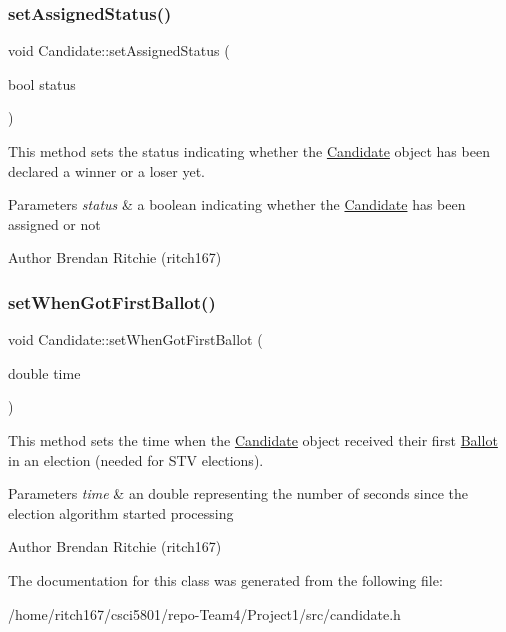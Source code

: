 \subsubsection{\texorpdfstring{set\+Assigned\+Status()}{setAssignedStatus()}}
{\footnotesize\ttfamily void Candidate\+::set\+Assigned\+Status (\begin{DoxyParamCaption}\item[{bool}]{status }\end{DoxyParamCaption})}

This method sets the status indicating whether the \hyperlink{classCandidate}{Candidate} object has been declared a winner or a loser yet. 
\begin{DoxyParams}{Parameters}
{\em status} & a boolean indicating whether the \hyperlink{classCandidate}{Candidate} has been assigned or not \\
\hline
\end{DoxyParams}
\begin{DoxyAuthor}{Author}
Brendan Ritchie (ritch167) 
\end{DoxyAuthor}
\mbox{\label{classCandidate_a97be1d696ea97201ec69a75bf708d9f2}} 
\subsubsection{\texorpdfstring{set\+When\+Got\+First\+Ballot()}{setWhenGotFirstBallot()}}
{\footnotesize\ttfamily void Candidate\+::set\+When\+Got\+First\+Ballot (\begin{DoxyParamCaption}\item[{double}]{time }\end{DoxyParamCaption})}

This method sets the time when the \hyperlink{classCandidate}{Candidate} object received their first \hyperlink{classBallot}{Ballot} in an election (needed for S\+TV elections). 
\begin{DoxyParams}{Parameters}
{\em time} & an double representing the number of seconds since the election algorithm started processing \\
\hline
\end{DoxyParams}
\begin{DoxyAuthor}{Author}
Brendan Ritchie (ritch167) 
\end{DoxyAuthor}


The documentation for this class was generated from the following file\+:\begin{DoxyCompactItemize}
\item 
/home/ritch167/csci5801/repo-\/\+Team4/\+Project1/src/candidate.\+h\end{DoxyCompactItemize}
